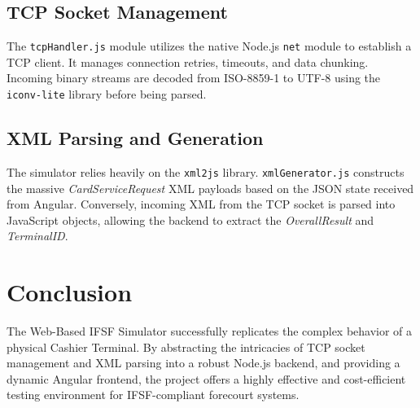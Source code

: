 \documentclass[12pt,a4paper]{report}
\begin{document}
\section{TCP Socket Management}
The \texttt{tcpHandler.js} module utilizes the native Node.js \texttt{net} module to establish a TCP client. It manages connection retries, timeouts, and data chunking. Incoming binary streams are decoded from ISO-8859-1 to UTF-8 using the \texttt{iconv-lite} library before being parsed.

\section{XML Parsing and Generation}
The simulator relies heavily on the \texttt{xml2js} library. \texttt{xmlGenerator.js} constructs the massive \textit{CardServiceRequest} XML payloads based on the JSON state received from Angular. Conversely, incoming XML from the TCP socket is parsed into JavaScript objects, allowing the backend to extract the \textit{OverallResult} and \textit{TerminalID}.

\chapter{Conclusion}
The Web-Based IFSF Simulator successfully replicates the complex behavior of a physical Cashier Terminal. By abstracting the intricacies of TCP socket management and XML parsing into a robust Node.js backend, and providing a dynamic Angular frontend, the project offers a highly effective and cost-efficient testing environment for IFSF-compliant forecourt systems.
\end{document}
